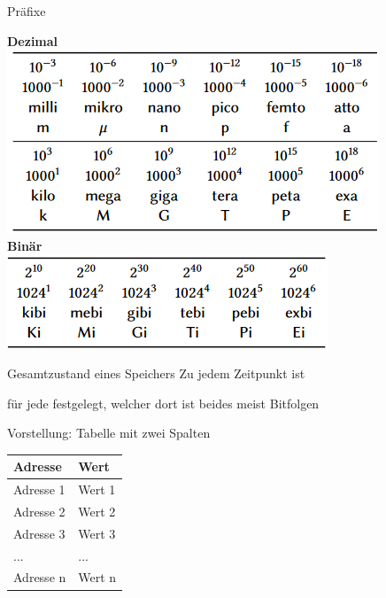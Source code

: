 \begin{frame}{Präfixe}
	\begin{center}
		\textbf{Dezimal}\\
		\includegraphics[scale=0.6]{images/dezimal.png}\\ \pause
		\textbf{Binär}\\
		\includegraphics[scale=0.6]{images/binaer.png}
	\end{center}
	
\end{frame}

\begin{frame}{Gesamtzustand eines Speichers}
	\p Zu jedem Zeitpunkt ist
	\begin{itemize}
		\pitem für jede  festgelegt, welcher  dort ist
		\pitem beides meist Bitfolgen
	\end{itemize}
	\p Vorstellung: Tabelle mit zwei Spalten\\
	\begin{center}
		\begin{tabular}{|l l|}
			\hline
			\textbf{Adresse} & \textbf{Wert} \\
			\hline
			Adresse 1& Wert 1 \\
			Adresse 2 & Wert 2 \\
			Adresse 3 & Wert 3 \\
			...&...\\
			Adresse n & Wert n\\
			\hline
		\end{tabular}
	\end{center}
\end{frame}

